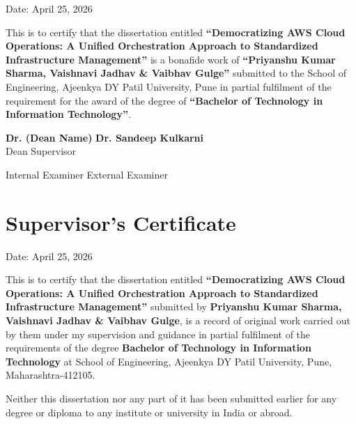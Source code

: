 \begin{flushright}
Date: April 25, 2026
\end{flushright}

This is to certify that the dissertation entitled \textbf{``Democratizing AWS Cloud Operations: A Unified Orchestration Approach to Standardized Infrastructure Management''} is a bonafide work of \textbf{``Priyanshu Kumar Sharma, Vaishnavi Jadhav \& Vaibhav Gulge''} submitted to the School of Engineering, Ajeenkya DY Patil University, Pune in partial fulfilment of the requirement for the award of the degree of \textbf{``Bachelor of Technology in Information Technology''}.

\vspace{3cm}

\begin{flushleft}
\textbf{Dr. (Dean Name)} \hfill \textbf{Dr. Sandeep Kulkarni}\\
Dean \hfill Supervisor
\end{flushleft}

\vspace{3cm}

\begin{flushleft}
Internal Examiner \hfill External Examiner
\end{flushleft}

\newpage

\chapter*{Supervisor's Certificate}

\begin{flushright}
Date: April 25, 2026
\end{flushright}

This is to certify that the dissertation entitled \textbf{``Democratizing AWS Cloud Operations: A Unified Orchestration Approach to Standardized Infrastructure Management''} submitted by \textbf{Priyanshu Kumar Sharma, Vaishnavi Jadhav \& Vaibhav Gulge}, is a record of original work carried out by them under my supervision and guidance in partial fulfilment of the requirements of the degree \textbf{Bachelor of Technology in Information Technology} at School of Engineering, Ajeenkya DY Patil University, Pune, Maharashtra-412105. 

Neither this dissertation nor any part of it has been submitted earlier for any degree or diploma to any institute or university in India or abroad.

